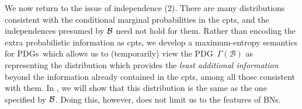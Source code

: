 \documentclass{article}
\newcommand{\MN}{PDG}
\newcommand{\MNs}{\MN s}
\numberwithin{equation}{section}
\begin{document}
	We now return to the issue of independence (2). There are many distributions consistent with the conditional marginal probabilities in the cpts, and the independences presumed by $\cal B$ need not hold for them. Rather than encoding the extra probabilistic information as cpts, we develop a maximum-entropy semantics for \MNs\, which allows us to (temporarily) view the \MN\ $\Gamma(\mathcal B)$ as representing the distribution which provides the \emph{least additional information} beyond the information already contained in the cpts, among all those consistent with them. In , we will show that this distribution is the same as the one specified by $\cal B$.
	Doing this, however, does not limit us to the features of BNs. 
	
\end{document}
